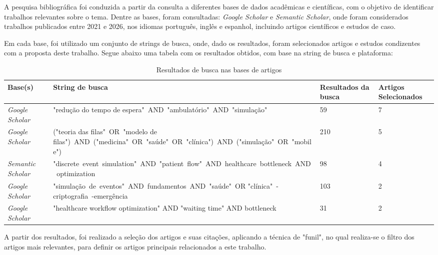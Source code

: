 \documentclass[
    12pt,                %
    openright,           %
    oneside,             %
    a4paper,             %
    english,             %
    brazil               %
]{abntex2}
\begin{document}
A pesquisa bibliográfica foi conduzida a partir da consulta a diferentes bases de dados acadêmicas e científicas, com o objetivo de identificar trabalhos relevantes sobre o tema. Dentre as bases, foram consultadas: \textit{Google Scholar} e \textit{Semantic Scholar}, onde foram considerados trabalhos publicados entre 2021 e 2026, nos idiomas português, inglês e espanhol, incluindo artigos científicos e estudos de caso.

Em cada base, foi utilizado um conjunto de strings de busca, onde, dado os resultados, foram selecionados artigos e estudos condizentes com a proposta deste trabalho. Segue abaixo uma tabela com os resultados obtidos, com base na string de busca e plataforma:

\begin{table}[H]
	\centering
	\footnotesize
	\caption{Resultados de busca nas bases de artigos}
	\setlength{\tabcolsep}{4pt}
	\begin{tabularx}{\textwidth}{p{3cm}|p{7cm}|p{2cm}|p{2cm}}
		\toprule
		\textbf{Base(s)} & \textbf{String de busca} & \textbf{Resultados da busca} & \textbf{Artigos Selecionados} \\ 
		\midrule
		\textit{Google Scholar} & "redução do tempo de espera"\ AND\ "ambulatório"\ AND\ "simulação" & 59 & 7 \\ 
		\midrule
		\textit{Google Scholar} & ("teoria das filas"\ OR\ "modelo de filas")\ AND\ ("medicina"\ OR\ "saúde"\ OR\ "clínica")\ AND\ ("simulação"\ OR\ "mobile") & 210 & 5 \\ 
		\midrule
		\textit{Semantic Scholar} & "discrete\ event\ simulation"\ AND\ "patient\ flow"\ AND\ healthcare\ bottleneck\ AND\ optimization & 98 & 4 \\ 
		\midrule
		\textit{Google Scholar} & "simulação\ de\ eventos"\ AND\ fundamentos\ AND\ "saúde"\ OR "clínica"\ -criptografia\ -emergência & 103 & 2 \\ 
		\midrule
		\textit{Google Scholar} & "healthcare workflow optimization" AND "waiting time" AND bottleneck & 31 & 2 \\ 
		\bottomrule
	\end{tabularx}
	\label{tab:busca}
\end{table}

A partir dos resultados, foi realizado a seleção dos artigos e suas citações, aplicando a técnica de "funil", no qual realiza-se o filtro dos artigos mais relevantes, para definir os artigos principais relacionados a este trabalho.
\end{document}
